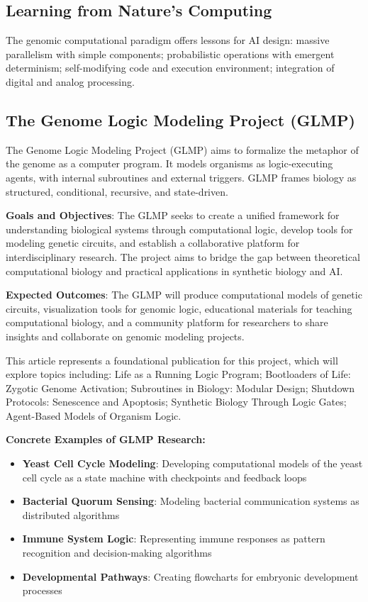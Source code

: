 \documentclass[11pt]{article}
\begin{document}
\subsection{Learning from Nature's Computing}

The genomic computational paradigm offers lessons for AI design: massive parallelism with simple components; probabilistic operations with emergent determinism; self-modifying code and execution environment; integration of digital and analog processing.

\subsection{The Genome Logic Modeling Project (GLMP)}

The Genome Logic Modeling Project (GLMP) aims to formalize the metaphor of the genome as a computer program. It models organisms as logic-executing agents, with internal subroutines and external triggers. GLMP frames biology as structured, conditional, recursive, and state-driven.

\textbf{Goals and Objectives}: The GLMP seeks to create a unified framework for understanding biological systems through computational logic, develop tools for modeling genetic circuits, and establish a collaborative platform for interdisciplinary research. The project aims to bridge the gap between theoretical computational biology and practical applications in synthetic biology and AI.

\textbf{Expected Outcomes}: The GLMP will produce computational models of genetic circuits, visualization tools for genomic logic, educational materials for teaching computational biology, and a community platform for researchers to share insights and collaborate on genomic modeling projects.

This article represents a foundational publication for this project, which will explore topics including: Life as a Running Logic Program; Bootloaders of Life: Zygotic Genome Activation; Subroutines in Biology: Modular Design; Shutdown Protocols: Senescence and Apoptosis; Synthetic Biology Through Logic Gates; Agent-Based Models of Organism Logic.

\textbf{Concrete Examples of GLMP Research:}
\begin{itemize}
\item \textbf{Yeast Cell Cycle Modeling}: Developing computational models of the yeast cell cycle as a state machine with checkpoints and feedback loops
\item \textbf{Bacterial Quorum Sensing}: Modeling bacterial communication systems as distributed algorithms
\item \textbf{Immune System Logic}: Representing immune responses as pattern recognition and decision-making algorithms
\item \textbf{Developmental Pathways}: Creating flowcharts for embryonic development processes
\end{itemize}
\end{document}
